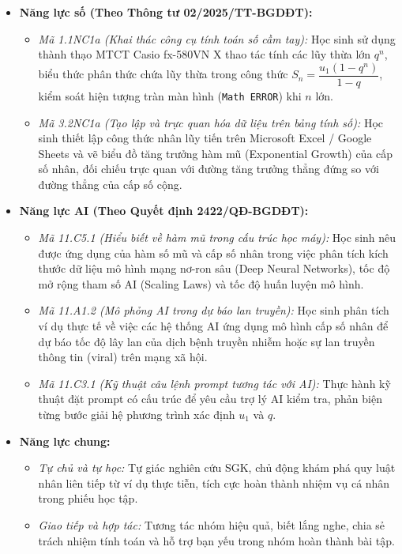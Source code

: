 \documentclass[12pt, a4paper]{article}
\begin{document}
\begin{itemize}[leftmargin=1.2cm]
    \item \textbf{Năng lực số (Theo Thông tư 02/2025/TT-BGDĐT):}
    \begin{itemize}[leftmargin=0.6cm]
        \item \textit{Mã 1.1NC1a (Khai thác công cụ tính toán số cầm tay):} Học sinh sử dụng thành thạo MTCT Casio fx-580VN X thao tác tính các lũy thừa lớn $q^n$, biểu thức phân thức chứa lũy thừa trong công thức $S_n = \dfrac{u_1(1 - q^n)}{1 - q}$, kiểm soát hiện tượng tràn màn hình (\texttt{Math ERROR}) khi $n$ lớn.
        \item \textit{Mã 3.2NC1a (Tạo lập và trực quan hóa dữ liệu trên bảng tính số):} Học sinh thiết lập công thức nhân lũy tiến trên Microsoft Excel / Google Sheets và vẽ biểu đồ tăng trưởng hàm mũ (Exponential Growth) của cấp số nhân, đối chiếu trực quan với đường tăng trưởng thẳng đứng so với đường thẳng của cấp số cộng.
    \end{itemize}

    \item \textbf{Năng lực AI (Theo Quyết định 2422/QĐ-BGDĐT):}
    \begin{itemize}[leftmargin=0.6cm]
        \item \textit{Mã 11.C5.1 (Hiểu biết về hàm mũ trong cấu trúc học máy):} Học sinh nêu được ứng dụng của hàm số mũ và cấp số nhân trong việc phân tích kích thước dữ liệu mô hình mạng nơ-ron sâu (Deep Neural Networks), tốc độ mở rộng tham số AI (Scaling Laws) và tốc độ huấn luyện mô hình.
        \item \textit{Mã 11.A1.2 (Mô phỏng AI trong dự báo lan truyền):} Học sinh phân tích ví dụ thực tế về việc các hệ thống AI ứng dụng mô hình cấp số nhân để dự báo tốc độ lây lan của dịch bệnh truyền nhiễm hoặc sự lan truyền thông tin (viral) trên mạng xã hội.
        \item \textit{Mã 11.C3.1 (Kỹ thuật câu lệnh prompt tương tác với AI):} Thực hành kỹ thuật đặt prompt có cấu trúc để yêu cầu trợ lý AI kiểm tra, phản biện từng bước giải hệ phương trình xác định $u_1$ và $q$.
    \end{itemize}

    \item \textbf{Năng lực chung:}
    \begin{itemize}[leftmargin=0.6cm]
        \item \textit{Tự chủ và tự học:} Tự giác nghiên cứu SGK, chủ động khám phá quy luật nhân liên tiếp từ ví dụ thực tiễn, tích cực hoàn thành nhiệm vụ cá nhân trong phiếu học tập.
        \item \textit{Giao tiếp và hợp tác:} Tương tác nhóm hiệu quả, biết lắng nghe, chia sẻ trách nhiệm tính toán và hỗ trợ bạn yếu trong nhóm hoàn thành bài tập.
    \end{itemize}
\end{itemize}
\end{document}
